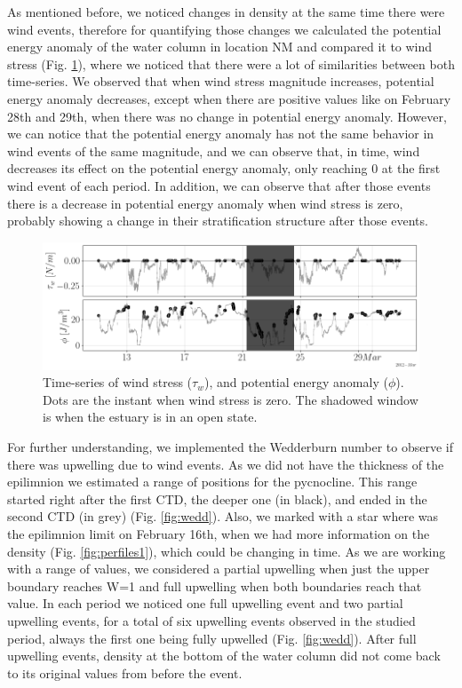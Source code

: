 \documentclass[tesis.tex]{subfiles}
\begin{document}
As mentioned before, we noticed changes in density at the same time there were wind events, therefore for quantifying those changes we calculated the potential energy anomaly of the water column in location NM and compared it to wind stress (Fig. \ref{fig:phi}), where we noticed that there were a lot of similarities between both time-series. We observed that when wind stress magnitude increases, potential energy anomaly decreases, except when there are positive values like on February 28th and 29th, when there was no change in potential energy anomaly. However, we can notice that the potential energy anomaly has not the same behavior in wind events of the same magnitude, and we can observe that, in time, wind decreases its effect on the potential energy anomaly, only reaching 0 at the first wind event of each period. In addition, we can observe that after those events there is a decrease in potential energy anomaly when wind stress is zero, probably showing a change in their stratification structure after those events.\\

\begin{figure}[h!]
    \centering
    \includegraphics[width=\textwidth]{Imagenes/phi.png}
    \caption{Time-series of wind stress ($\tau_w$), and potential energy anomaly ($\phi$). Dots are the instant when wind stress is zero. The shadowed window is when the estuary is in an open state.}
    \label{fig:phi}
\end{figure}

For further understanding, we implemented the Wedderburn number to observe if there was upwelling due to wind events. As we did not have the thickness of the epilimnion we estimated a range of positions for the pycnocline. This range started right after the first CTD, the deeper one (in black), and ended in the second CTD (in grey) (Fig. \ref{fig:wedd}). Also, we marked with a star where was the epilimnion limit on February 16th, when we had more information on the density (Fig. \ref{fig:perfiles1}), which could be changing in time. As we are working with a range of values, we considered a partial upwelling when just the upper boundary reaches W=1 and full upwelling when both boundaries reach that value. In each period we noticed one full upwelling event and two partial upwelling events, for a total of six upwelling events observed in the studied period, always the first one being fully upwelled (Fig. \ref{fig:wedd}). After full upwelling events, density at the bottom of the water column did not come back to its original values from before the event. \\
\end{document}

